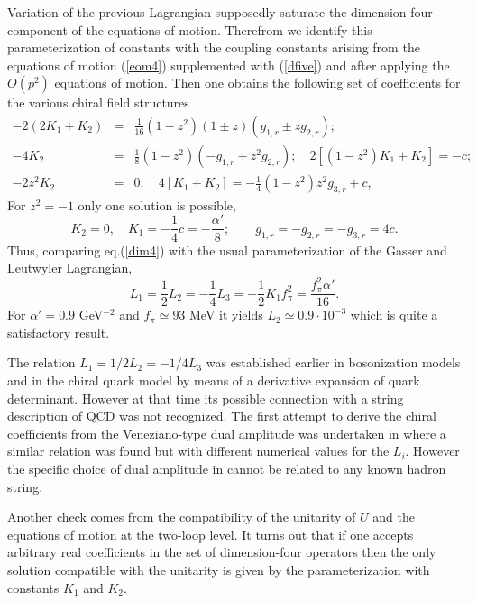 \documentclass[a4paper,12pt]{article}
\begin{document}
Variation of the previous Lagrangian supposedly saturate the 
dimension-four component of the equations of motion. Therefrom we identify 
this parameterization of constants with the coupling
constants arising from the equations of motion (\ref{eom4}) supplemented 
with (\ref{dfive}) and after applying the $O(p^2)$ equations of motion. 
Then
one obtains the following set of coefficients for the various chiral 
field structures
\begin{eqnarray}
-2(2K_1 + K_2) &=& \frac{1}{16} (1-z^2)(1\pm z)(g_{1,r} \pm z g_{2,r});
\nonumber\\
-4K_2 &=& \frac18 (1-z^2)(- g_{1,r} + z^2 g_{2,r});\quad 
2[(1-z^2) K_1 + K_2] = -c;\nonumber\\
 -2z^2 K_2&=& 0;\quad 
4[K_1 + K_2] = - \frac14 (1-z^2)z^2g_{3,r} + c,
\end{eqnarray}
For  $z^2 = -1$ only  one solution is possible, 
\begin{equation}
K_2 = 0, \quad K_1 = -\frac14 c = - \frac{\alpha' }{8};\quad\quad
g_{1,r} = - g_{2,r} =  - g_{3,r} = 4 c.
\end{equation}
Thus, comparing eq.(\ref{dim4}) with the usual parameterization
of the Gasser and Leutwyler Lagrangian\cite{GL},   
\begin{equation}
L_1 = \frac12 L_2 = -\frac14 L_3 = - \frac12 K_1 f_\pi^2 = 
\frac{ f_\pi^2\alpha' }{16}.
\end{equation}
For $\alpha' = 0.9$ GeV$^{-2}$ and $f_\pi \simeq 93$ MeV it 
yields $L_2 \simeq 0.9 \cdot 10^{-3}$ 
which is quite a satisfactory result\cite{expt}.

The relation
$L_1 = 1/2 L_2 = -1/4 L_3$ was
established earlier
in bosonization models \cite{AnBo}
and in the chiral quark model\cite{Espr} by means of
a derivative expansion of quark determinant. However at that time its possible
connection with a string
description of QCD was not recognized. The first attempt to derive the
chiral coefficients from the Veneziano-type dual amplitude was
undertaken in\cite{PV} where  a similar relation was found but with different numerical values for the $L_i$. 
However the specific choice of dual amplitude in \cite{PV}
cannot be related to any known hadron string.

Another check
comes from the compatibility of the unitarity of $U$ 
and the equations of motion at the two-loop 
level. It turns out that if 
one accepts arbitrary real coefficients
in the set of dimension-four operators then the 
only solution
compatible with the unitarity is given by the parameterization with 
constants $K_1$ and
$K_2$. \\
\end{document}
